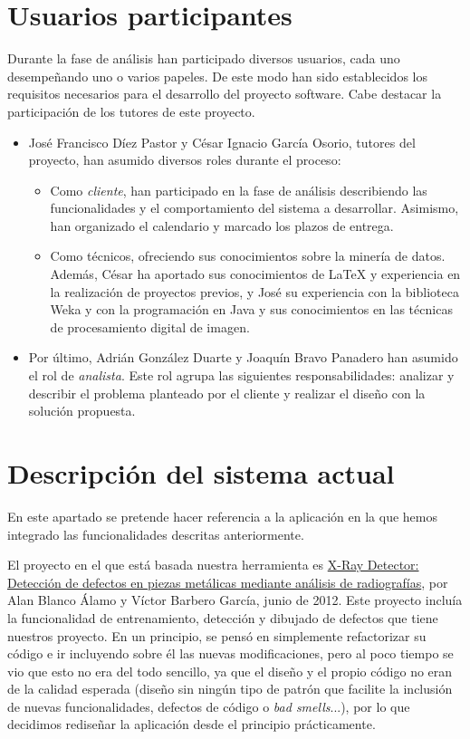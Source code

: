 \section{Usuarios participantes}
Durante la fase de análisis han participado diversos usuarios, cada uno desempeñando uno o varios papeles. De este modo han sido establecidos los requisitos necesarios para el desarrollo del proyecto software. Cabe destacar la participación de los tutores de este proyecto.
\begin{itemize}
 \item José Francisco Díez Pastor y César Ignacio García Osorio, tutores del proyecto, han asumido diversos roles durante el proceso:
 \begin{itemize}
  \item Como \textit{cliente}, han participado en la fase de análisis describiendo las funcionalidades y el comportamiento del sistema a desarrollar. Asimismo, han organizado el calendario y marcado los plazos de entrega.
  \item Como técnicos, ofreciendo sus conocimientos sobre la minería de datos. Además, César ha aportado sus conocimientos de LaTeX y experiencia en la realización de proyectos previos, y José su experiencia con la biblioteca Weka y con la programación en Java y sus conocimientos en las técnicas de procesamiento digital de imagen.
 \end{itemize}
 \item Por último, Adrián González Duarte y Joaquín Bravo Panadero han asumido el rol de \textit{analista}. Este rol agrupa las siguientes responsabilidades: analizar y describir el problema planteado por el cliente y realizar el diseño con la solución propuesta.
\end{itemize}
\newpage

\section{Descripción del sistema actual}
En este apartado se pretende hacer referencia a la aplicación en la que hemos integrado las funcionalidades descritas anteriormente.

El proyecto en el que está basada nuestra herramienta es \underline{X-Ray Detector: Detección de defectos en piezas metálicas mediante análisis de radiografías}, por Alan Blanco Álamo y Víctor Barbero García, junio de 2012. Este proyecto incluía la funcionalidad de entrenamiento, detección y dibujado de defectos que tiene nuestros proyecto. En un principio, se pensó en simplemente refactorizar su código e ir incluyendo sobre él las nuevas modificaciones, pero al poco tiempo se vio que esto no era del todo sencillo, ya que el diseño y el propio código no eran de la calidad esperada (diseño sin ningún tipo de patrón que facilite la inclusión de nuevas funcionalidades, defectos de código o \textit{bad smells}...), por lo que decidimos rediseñar la aplicación desde el principio prácticamente.

